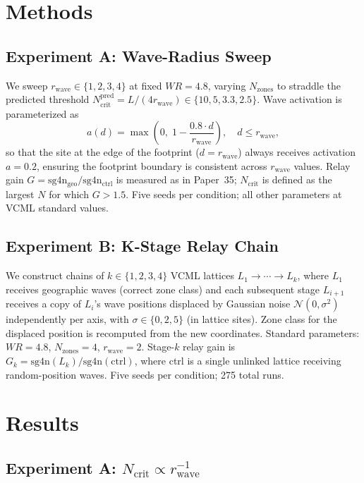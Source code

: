 \documentclass[11pt]{article}
\begin{document}
\section{Methods}

\subsection{Experiment A: Wave-Radius Sweep}

We sweep $r_\mathrm{wave} \in \{1,2,3,4\}$ at fixed $WR=4.8$, varying $N_\mathrm{zones}$
to straddle the predicted threshold $N_\mathrm{crit}^\mathrm{pred} = L/(4r_\mathrm{wave})
\in \{10, 5, 3.3, 2.5\}$.
Wave activation is parameterized as
\begin{equation}
  a(d) = \max\!\left(0,\; 1 - \frac{0.8 \cdot d}{r_\mathrm{wave}}\right), \quad d \le r_\mathrm{wave},
\end{equation}
so that the site at the edge of the footprint ($d = r_\mathrm{wave}$) always
receives activation $a = 0.2$, ensuring the footprint boundary is consistent
across $r_\mathrm{wave}$ values.
Relay gain $G = \mathrm{sg4n_{geo}} / \mathrm{sg4n_{ctrl}}$ is measured as
in Paper~35; $N_\mathrm{crit}$ is defined as the largest $N$ for which $G > 1.5$.
Five seeds per condition; all other parameters at VCML standard values.

\subsection{Experiment B: K-Stage Relay Chain}

We construct chains of $k \in \{1,2,3,4\}$ VCML lattices $L_1 \to \cdots \to L_k$,
where $L_1$ receives geographic waves (correct zone class) and each subsequent
stage $L_{i+1}$ receives a copy of $L_i$'s wave positions displaced by
Gaussian noise $\mathcal{N}(0, \sigma^2)$ independently per axis, with
$\sigma \in \{0, 2, 5\}$ (in lattice sites).
Zone class for the displaced position is recomputed from the new coordinates.
Standard parameters: $WR=4.8$, $N_\mathrm{zones}=4$, $r_\mathrm{wave}=2$.
Stage-$k$ relay gain is $G_k = \mathrm{sg4n}(L_k) / \mathrm{sg4n}(\mathrm{ctrl})$,
where ctrl is a single unlinked lattice receiving random-position waves.
Five seeds per condition; 275 total runs.

\section{Results}

\subsection{Experiment A: $N_\mathrm{crit} \propto r_\mathrm{wave}^{-1}$}
\end{document}
